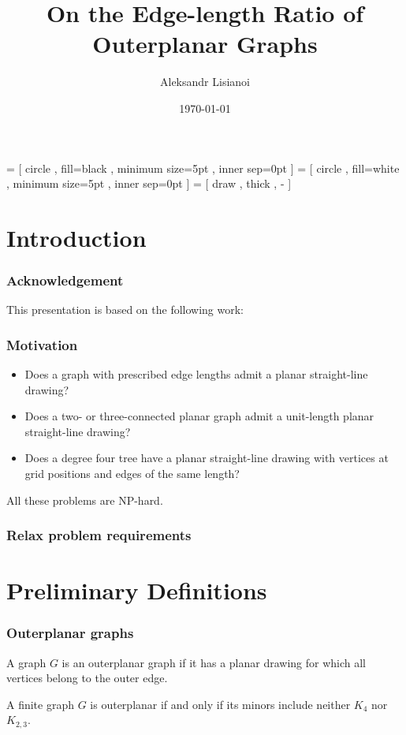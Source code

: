 \documentclass[xetex,mathserif,serif]{beamer}
\title{On the Edge-length Ratio of Outerplanar Graphs}
\author{Aleksandr Lisianoi}
\institute{Technische Universität Wien}
\date{\today}
\begin{document}
 = [
  circle
  , fill=black
  , minimum size=5pt
  , inner sep=0pt
]
 = [
  circle
  , fill=white
  , minimum size=5pt
  , inner sep=0pt
]
 = [
  draw
  , thick
  , -
]


\maketitle

\section{Introduction}

\begin{frame}
  \frametitle{Acknowledgement}

  This presentation is based on the following work:

\end{frame}

\begin{frame}
  \frametitle{Motivation}

  \begin{itemize}
  \item Does a graph with prescribed edge lengths admit a planar straight-line drawing?
  \item Does a two- or three-connected planar graph admit a unit-length planar straight-line drawing?
  \item Does a degree four tree have a planar straight-line drawing with vertices at grid positions and edges of the same length?
  \end{itemize}

  \begin{center}
    All these problems are NP-hard.
    \end{center}

\end{frame}

\begin{frame}
  \frametitle{Relax problem requirements}
\end{frame}

\section{Preliminary Definitions}

\begin{frame}
  \frametitle{Outerplanar graphs}

    \begin{definition}
    A graph \(G\) is an outerplanar graph if it has a planar drawing for which all vertices belong to the outer edge.
  \end{definition}

  \begin{definition}
    A finite graph \(G\) is outerplanar if and only if its minors include neither \(K_4\) nor \(K_{2, 3}\).
  \end{definition}
\end{frame}
\end{document}
